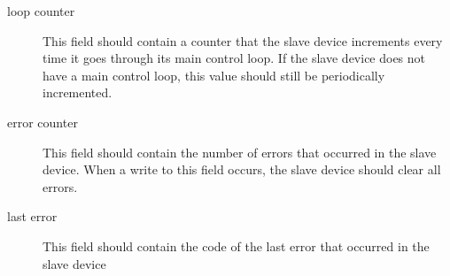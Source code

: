 \begin{description}
\item[loop counter]
    This field should contain a counter that the slave device increments every time it goes through its main control loop.
    If the slave device does not have a main control loop, this value should still be periodically incremented.

\item[error counter]
    This field should contain the number of errors that occurred in the slave device.
    When a write to this field occurs, the slave device should clear all errors.

\item[last error]
    This field should contain the code of the last error that occurred in the slave device
    
\end{description}

